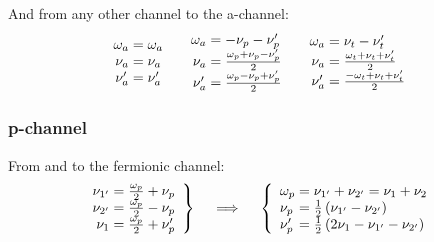\documentclass[12pt,a4paper,roman]{article}
\begin{document}
And from any other channel to the a-channel:
\begin{align}
    \begin{array}{r@{\mskip\thickmuskip}l}
    \omega_a &= \omega_a\\
    \nu_a  &= \nu_a \\
    \nu'_a &= \nu'_a\\
  \end{array}
  \quad  \begin{array}{r@{\mskip\thickmuskip}l}
    \omega_a &= -\nu_p-\nu'_p\\
    \nu_a  &= \frac{\omega_p+\nu_p-\nu'_p}{2}\\
    \nu'_a &= \frac{\omega_p-\nu_p+\nu'_p}{2}\\
  \end{array} \quad
  \begin{array}{r@{\mskip\thickmuskip}l}
    \omega_a &= \nu_t-\nu'_t\\
    \nu_a  &= \frac{ \omega_t+\nu_t+\nu'_t}{2}\\
    \nu'_a &= \frac{-\omega_t+\nu_t+\nu'_t}{2}\\
  \end{array}
\end{align}


\subsubsection*{p-channel}
From and to the fermionic channel:
\begin{align}
    \left.\begin{array}{r@{\mskip\thickmuskip}l}
    \nu_{1'} &= \frac{\omega_p}{2} + \nu_p \\
    \nu_{2'} &= \frac{\omega_p}{2} - \nu_p \\
    \nu_{1}  &= \frac{\omega_p}{2} + \nu'_p\\
  \end{array} \right\}
  \quad \implies \quad
  \left\{\begin{array}{l@{\mskip\thickmuskip}l}
    \omega_p &= \nu_{1'} + \nu_{2'} = \nu_{1} + \nu_{2}\\
    \nu_p    &= \frac{1}{2}\left(\nu_{1'}-\nu_{2'}\right) \\
    \nu'_p   &= \frac{1}{2}\left(2\nu_{1}-\nu_{1'}-\nu_{2'}\right)\\
  \end{array}\right.
\end{align}
\end{document}
